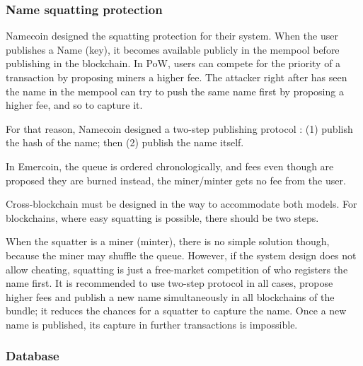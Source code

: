 \begin{multicols}{2}
\vspace{-.7cm}

\subsubsection{Name squatting protection}\label{subsubsec-4.2.g}

\vspace{-.3cm}

Namecoin designed the squatting protection for their system. When the user publishes a Name (key), it becomes available publicly in the mempool before publishing in the blockchain. In PoW, users can compete for the priority of a transaction by proposing miners a higher fee. The attacker right after has seen the name in the mempool can try to push the same name first by proposing a higher fee, and so to capture it.

\vspace{-.1cm}

For that reason, Namecoin designed a two-step publishing protocol \cite{art1-key35}: (1) publish the hash of the name; then (2) publish the name itself.

\vspace{-.15cm}

In Emercoin, the queue is ordered chronologically, and fees even though are proposed they are burned instead, the miner/minter gets no fee from the user.

\vspace{-.15cm}

Cross-blockchain must be designed in the way to accommodate both models. For blockchains, where easy squatting is possible, there should be two steps.

\vspace{-.15cm}

When the squatter is a miner (minter), there is no simple solution though, because the miner may shuffle the queue. However, if the system design does not allow cheating, squatting is just a free-market competition of who registers the name first. It is recommended to use two-step protocol in all cases, propose higher fees and publish a new name simultaneously in all blockchains of the bundle; it reduces the chances for a squatter to capture the name. Once a new name is published, its capture in further transactions is impossible.

\vspace{-.9cm}

\subsubsection{Database}\label{subsubsec-4.2.h}


\end{multicols}
